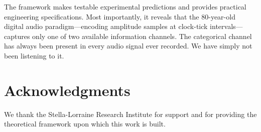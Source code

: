\documentclass[twocolumn,10pt]{article}
\theoremstyle{remark}
\begin{document}
The framework makes testable experimental predictions and provides practical engineering specifications. Most importantly, it reveals that the 80-year-old digital audio paradigm---encoding amplitude samples at clock-tick intervals---captures only one of two available information channels. The categorical channel has always been present in every audio signal ever recorded. We have simply not been listening to it.

\section*{Acknowledgments}

We thank the Stella-Lorraine Research Institute for support and for providing the theoretical framework upon which this work is built.



\end{document}
